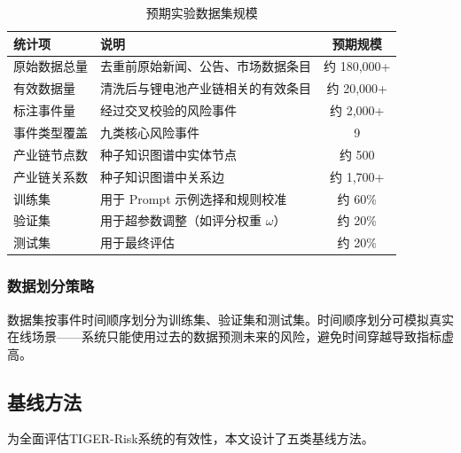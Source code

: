 \documentclass[12pt,a4paper]{article}
\newcommand{\projectshort}{TIGER-Risk}
\begin{document}
\begin{table}[H]
\centering
\footnotesize
\caption{预期实验数据集规模}
\label{tab:dataset-stats}
\begin{tabularx}{0.95\linewidth}{l X c}
\toprule
\textbf{统计项} & \textbf{说明} & \textbf{预期规模} \\
\midrule
原始数据总量 & 去重前原始新闻、公告、市场数据条目 & 约 180,000+ \\
有效数据量 & 清洗后与锂电池产业链相关的有效条目 & 约 20,000+ \\
标注事件量 & 经过交叉校验的风险事件 & 约 2,000+ \\
事件类型覆盖 & 九类核心风险事件 & 9 \\
产业链节点数 & 种子知识图谱中实体节点 & 约 500 \\
产业链关系数 & 种子知识图谱中关系边 & 约 1,700+ \\
训练集 & 用于 Prompt 示例选择和规则校准 & 约 60\% \\
验证集 & 用于超参数调整（如评分权重 $\omega$） & 约 20\% \\
测试集 & 用于最终评估 & 约 20\% \\
\bottomrule
\end{tabularx}
\end{table}

\subsubsection{数据划分策略}

数据集按事件时间顺序划分为训练集、验证集和测试集。时间顺序划分可模拟真实在线场景——系统只能使用过去的数据预测未来的风险，避免时间穿越导致指标虚高。

\subsection{基线方法}
\label{sec:exp-baseline}

为全面评估\projectshort 系统的有效性，本文设计了五类基线方法。
\end{document}
